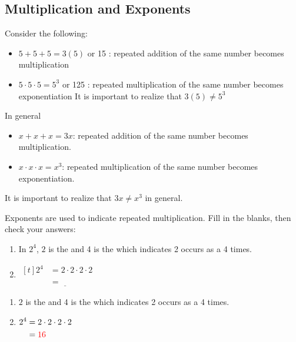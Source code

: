 \subsection{Multiplication and Exponents}
Consider the following:
\begin{itemize}
	\item $5+5+5=3(5)$ or 15 : repeated addition of the same number becomes multiplication
	\item $5\cdot 5\cdot 5=5^3$ or 125 : repeated multiplication of the same number becomes exponentiation It is important
to realize that $3(5)\ne 5^3$
\end{itemize}
In general
\begin{itemize}
	\item $x+x+x=3x$: repeated addition of the same number becomes multiplication.
	\item $x\cdot x\cdot x=x^3$: repeated multiplication of the same number becomes exponentiation.
\end{itemize}

It is important to realize that $3x\ne x^3$ in general.

\begin{myexample}
Exponents are used to indicate repeated multiplication. Fill in the blanks, then check your answers:
\begin{enumerate}
	\item In $2^4$, $2$ is the \underline{\phantom{base}} and 4 is the \underline{\phantom{exponent}} which indicates 2
	occurs as a \underline{} 4 times.
	\item 
	$\begin{aligned}[t]
	2^4 &= 2\cdot 2\cdot 2\cdot 2 \\
	& = \underline{\phantom{16}}
	\end{aligned}$
\end{enumerate} 
\end{myexample}
\begin{myProof}
	\begin{enumerate}
		\item $2$ is the {\color{red}{base}} and 4 is the {\color{red}{exponent}} which indicates 2
		occurs as a {\color{red}{factor}} 4 times.
		\item 
		$\begin{aligned}[t]
		2^4 & = 2\cdot 2\cdot 2\cdot 2 \\
		&= {\color{red}{{16}}}
		\end{aligned}$
	\end{enumerate} 
	{}
		
\end{myProof}	
